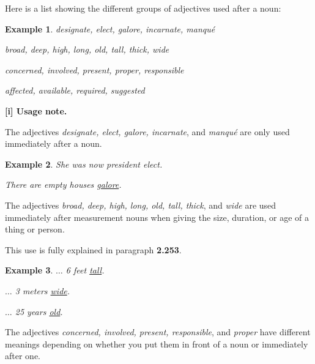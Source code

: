 \documentclass[oneside]{book}
\numberwithin{equation}{section}
\newtheorem{example}{Example}[section]
\begin{document}
Here is a list showing the different groups of adjectives used after a noun:
\begin{example}
    designate, elect, galore, incarnate, manqu\'e
    
    broad, deep, high, long, old, tall, thick, wide
    
    concerned, involved, present, proper, responsible
    
    affected, available, required, suggested
\end{example}
%
\textbf{[i] Usage note.}

%
\noindent{} The adjectives \textit{designate, elect, galore, incarnate}, and \textit{manqu\'e} are only used immediately after a noun.
\begin{example}
    She was now president \textit{elect}.
    
    There are empty houses \underline{galore}.
\end{example}
%
\noindent{} The adjectives \textit{broad, deep, high, long, old, tall, thick}, and \textit{wide} are used immediately after measurement nouns when giving the size, duration, or age of a thing or person.

This use is fully explained in paragraph \textbf{2.253}.
\begin{example}
    $\ldots$ 6 feet \underline{tall}.
    
    $\ldots$ 3 meters \underline{wide}.
    
    $\ldots$ 25 years \underline{old}.
\end{example}
%
\noindent{} The adjectives \textit{concerned, involved, present, responsible}, and \textit{proper} have different meanings depending on whether you put them in front of a noun or immediately after one.
\end{document}
